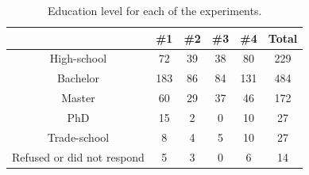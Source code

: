 \documentclass[letterpaper]{article} %
\begin{document}
\begin{table}
\centering
\begin{tabular}{ c|c c c c c } 
\hline
 & \#1 & \#2 & \#3 & \#4 & Total\\
 \hline
High-school & 72 & 39 & 38 & 80 & 229\\
Bachelor & 183 & 86 & 84 & 131 & 484\\
Master & 60 & 29 & 37 & 46 & 172\\
PhD & 15 & 2 & 0 & 10 & 27\\
Trade-school & 8 & 4 & 5 & 10 & 27\\
Refused or did not respond & 5 & 3 & 0 & 6 & 14\\
 \hline
\end{tabular}
\caption{Education level for each of the experiments.}
\label{tbl:education}
\end{table}





\end{document}
